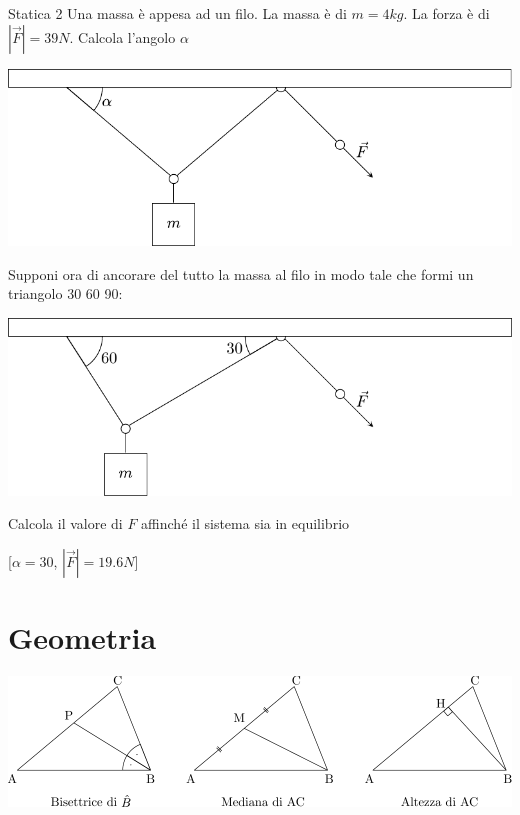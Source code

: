 \begin{esercizio}{Statica 2}
	Una massa è appesa ad un filo. La massa è di $ m = 4 kg $. La forza è di $ \left|\vec{F}\right| = 39 N $. Calcola l'angolo $ \alpha $
	\begin{center}
		\includegraphics{Images/Statica2.pdf }
	\end{center}
	Supponi ora di ancorare del tutto la massa al filo in modo tale che formi un triangolo 30 60 90:
	\begin{center}
		\includegraphics{Images/Statica2.1.pdf }
	\end{center}

	Calcola il valore di $ F $ affinché il sistema sia in equilibrio

	\hfill[$ \alpha = 30 $, $ \left|\vec{F}\right|=19.6 N $]
\end{esercizio}

\section{Geometria}
\vskip3mm
\begin{center}
	\includegraphics{Images/Triangoli1.pdf }
\end{center}

